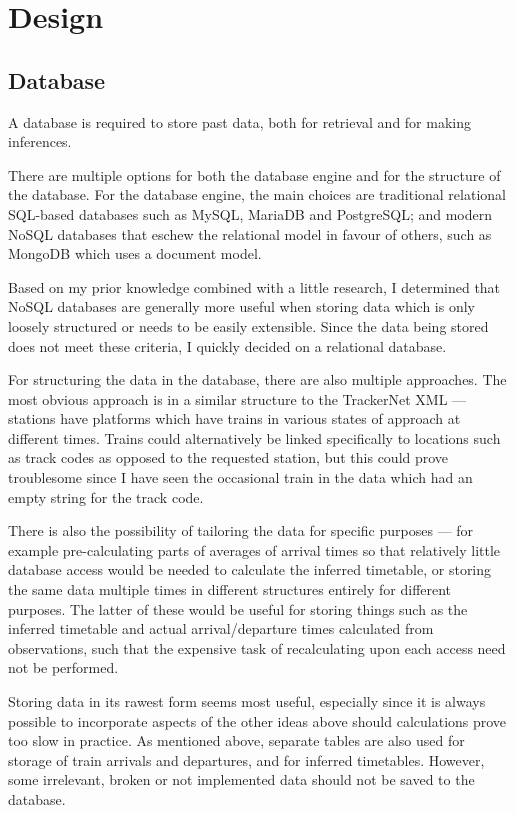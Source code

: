 \documentclass[a4paper,12pt]{report}
\begin{document}
\chapter{Design}

\section{Database}

A database is required to store past data, both for retrieval and for making
inferences.

There are multiple options for both the database engine and for the structure
of the database. For the database engine, the main choices are traditional
relational SQL-based databases such as MySQL, MariaDB and PostgreSQL; and
modern NoSQL databases that eschew the relational model in favour of others,
such as MongoDB which uses a document model.

Based on my prior knowledge combined with a little research, I determined that
NoSQL databases are generally more useful when storing data which is only
loosely structured or needs to be easily extensible. Since the data being
stored does not meet these criteria, I quickly decided on a relational
database.

For structuring the data in the database, there are also multiple approaches.
The most obvious approach is in a similar structure to the TrackerNet XML ---
stations have platforms which have trains in various states of approach at
different times. Trains could alternatively be linked specifically to locations
such as track codes as opposed to the requested station, but this could prove
troublesome since I have seen the occasional train in the data which had an
empty string for the track code.

There is also the possibility of tailoring the data for specific purposes ---
for example pre-calculating parts of averages of arrival times so that
relatively little database access would be needed to calculate the inferred
timetable, or storing the same data multiple times in different structures
entirely for different purposes. The latter of these would be useful for
storing things such as the inferred timetable and actual arrival/departure
times calculated from observations, such that the expensive task of
recalculating upon each access need not be performed.

Storing data in its rawest form seems most useful, especially since it is
always possible to incorporate aspects of the other ideas above should
calculations prove too slow in practice. As mentioned above, separate tables
are also used for storage of train arrivals and departures, and for inferred
timetables. However, some irrelevant, broken or not implemented data should not
be saved to the database.
\end{document}
